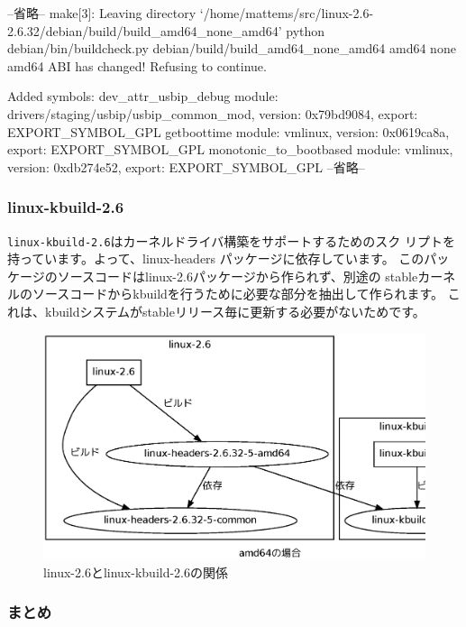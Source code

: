 \documentclass[mingoth,a4paper]{jsarticle}
\begin{document}
\begin{commandline}
--省略--
make[3]: Leaving directory  `/home/mattems/src/linux-2.6-2.6.32/debian/build/build_amd64_none_amd64'
python debian/bin/buildcheck.py debian/build/build_amd64_none_amd64 amd64 none amd64
ABI has changed!  Refusing to continue.

Added symbols:
dev_attr_usbip_debug    module: drivers/staging/usbip/usbip_common_mod, version: 0x79bd9084, export: EXPORT_SYMBOL_GPL 
getboottime             module: vmlinux, version: 0x0619ca8a, export: EXPORT_SYMBOL_GPL
monotonic_to_bootbased  module: vmlinux, version: 0xdb274e52, export: EXPORT_SYMBOL_GPL
--省略--
\end{commandline}

\subsubsection{linux-kbuild-2.6}
\texttt{linux-kbuild-2.6}はカーネルドライバ構築をサポートするためのスク
リプトを持っています。よって、linux-headers パッケージに依存しています。
このパッケージのソースコードはlinux-2.6パッケージから作られず、別途の
stableカーネルのソースコードからkbuildを行うために必要な部分を抽出して作られます。
これは、kbuildシステムがstableリリース毎に更新する必要がないためです。

\begin{figure}[H]
\begin{center}
\includegraphics[width=0.8\hsize]{image201005/linux-kbuild-2.6.eps}
\caption{linux-2.6とlinux-kbuild-2.6の関係}
\label{fig:linux-kbuild-2.6}
\end{center}
\end{figure}


\subsubsection{まとめ}
\end{document}
